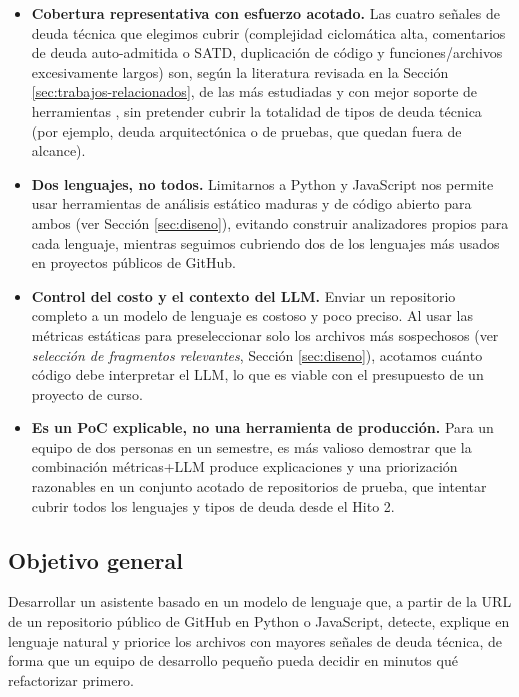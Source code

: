 \begin{itemize}
    \item \textbf{Cobertura representativa con esfuerzo acotado.} Las cuatro señales de deuda técnica que elegimos cubrir (complejidad ciclomática alta, comentarios de deuda auto-admitida o SATD, duplicación de código y funciones/archivos excesivamente largos) son, según la literatura revisada en la Sección \ref{sec:trabajos-relacionados}, de las más estudiadas y con mejor soporte de herramientas \parencite{McCabe1976,PotdarShihab2014}, sin pretender cubrir la totalidad de tipos de deuda técnica (por ejemplo, deuda arquitectónica o de pruebas, que quedan fuera de alcance).
    \item \textbf{Dos lenguajes, no todos.} Limitarnos a Python y JavaScript nos permite usar herramientas de análisis estático maduras y de código abierto para ambos (ver Sección \ref{sec:diseno}), evitando construir analizadores propios para cada lenguaje, mientras seguimos cubriendo dos de los lenguajes más usados en proyectos públicos de GitHub.
    \item \textbf{Control del costo y el contexto del LLM.} Enviar un repositorio completo a un modelo de lenguaje es costoso y poco preciso. Al usar las métricas estáticas para preseleccionar solo los archivos más sospechosos (ver \textit{selección de fragmentos relevantes}, Sección \ref{sec:diseno}), acotamos cuánto código debe interpretar el LLM, lo que es viable con el presupuesto de un proyecto de curso.
    \item \textbf{Es un PoC explicable, no una herramienta de producción.} Para un equipo de dos personas en un semestre, es más valioso demostrar que la combinación métricas+LLM produce explicaciones y una priorización razonables en un conjunto acotado de repositorios de prueba, que intentar cubrir todos los lenguajes y tipos de deuda desde el Hito 2.
\end{itemize}

\subsection{Objetivo general}

Desarrollar un asistente basado en un modelo de lenguaje que, a partir de la URL de un repositorio público de GitHub en Python o JavaScript, detecte, explique en lenguaje natural y priorice los archivos con mayores señales de deuda técnica, de forma que un equipo de desarrollo pequeño pueda decidir en minutos qué refactorizar primero.

